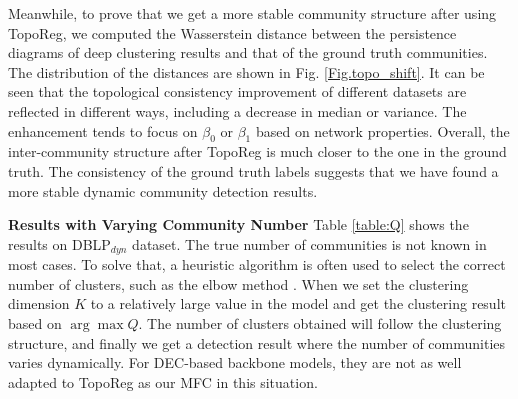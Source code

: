 \documentclass[letterpaper]{article} %
\begin{document}
Meanwhile, to prove that we get a more stable community structure after using TopoReg, we computed the Wasserstein distance between the persistence diagrams of   deep clustering results and that of the ground truth communities. The distribution of the distances are shown in Fig. \ref{Fig.topo_shift}. It can be seen that the topological consistency improvement of different datasets are reflected in different ways, including a decrease in median or variance. The enhancement tends to focus on $\beta_0$ or $\beta_1$ based on network properties. Overall, the inter-community structure after TopoReg is much closer to the one in the ground truth. The consistency of the ground truth labels suggests that we have found a more stable dynamic community detection results.%

 

\noindent\textbf{Results with Varying Community Number} Table \ref{table:Q} shows the results on DBLP$_{dyn}$ dataset. The true number of communities is not known in most cases. To solve that, a heuristic algorithm is often used to select the correct number of clusters, such as the elbow method \cite{liu2020determine}. When we set the clustering dimension $K$ to a relatively large value in the model and get the clustering result based on $\arg \max Q$. The number of clusters obtained will follow the clustering structure, and finally we get a detection result where the number of communities varies dynamically. For DEC-based backbone models, they are not as well adapted to TopoReg as our MFC in this situation. %
\end{document}
